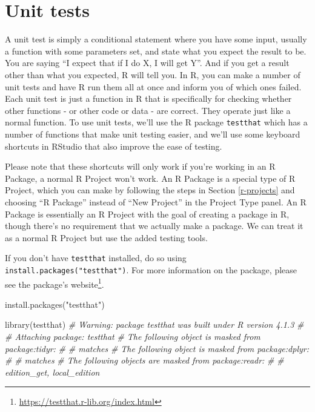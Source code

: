 \documentclass[
  a4paper,
]{krantz}
\makeatletter
\newenvironment{Shaded}{\begin{snugshade}}{\end{snugshade}}
\newcommand{\CommentTok}[1]{\textcolor[rgb]{0.37,0.37,0.37}{\textit{#1}}}
\newcommand{\FunctionTok}[1]{\textcolor[rgb]{0,0,0}{#1}}
\newcommand{\NormalTok}[1]{#1}
\newcommand{\StringTok}[1]{\textcolor[rgb]{0.5,0.5,0.5}{#1}}
\renewcommand{\href}[2]{#2\footnote{\url{#1}}}
\newenvironment{kframe}{%
\medskip{}
\setlength{\fboxsep}{.8em}
 \def\at@end@of@kframe{}%
 \ifinner\ifhmode%
  \def\at@end@of@kframe{\end{minipage}}%
  \begin{minipage}{\columnwidth}%
 \fi\fi%
 \def\FrameCommand##1{\hskip\@totalleftmargin \hskip-\fboxsep
 \colorbox{shadecolor}{##1}\hskip-\fboxsep
     \hskip-\linewidth \hskip-\@totalleftmargin \hskip\columnwidth}%
 \MakeFramed {\advance\hsize-\width
   \@totalleftmargin\z@ \linewidth\hsize
   \@setminipage}}%
 {\par\unskip\endMakeFramed%
 \at@end@of@kframe}
\renewenvironment{Shaded}{\begin{kframe}}{\end{kframe}}
\makeatother
\begin{document}
\hypertarget{unit-tests}{%
\section{Unit tests}\label{unit-tests}}

A unit test is simply a conditional statement where you have
some input, usually a function with some parameters set, and
state what you expect the result to be. You are saying ``I
expect that if I do X, I will get Y''. And if you get a
result other than what you expected, R will tell you. In R,
you can make a number of unit tests and have R run them all
at once and inform you of which ones failed. Each unit test
is just a function in R that is specifically for checking
whether other functions - or other code or data - are
correct. They operate just like a normal function. To use
unit tests, we'll use the R package \texttt{testthat} which
has a number of functions that make unit testing easier, and
we'll use some keyboard shortcuts in RStudio that also
improve the ease of testing.

Please note that these shortcuts will only work if you're
working in an R Package, a normal R Project won't work. An R
Package is a special type of R Project, which you can make
by following the steps in Section \ref{r-projects} and
choosing ``R Package'' instead of ``New Project'' in the
Project Type panel. An R Package is essentially an R Project
with the goal of creating a package in R, though there's no
requirement that we actually make a package. We can treat it
as a normal R Project but use the added testing tools.

If you don't have \texttt{testthat} installed, do so using
\texttt{install.packages("testthat")}. For more information
on the package, please see the package's
\href{https://testthat.r-lib.org/index.html}{website}.

\begin{Shaded}
\begin{Highlighting}[]
\FunctionTok{install.packages}\NormalTok{(}\StringTok{"testthat"}\NormalTok{)}
\end{Highlighting}
\end{Shaded}

\begin{Shaded}
\begin{Highlighting}[]
\FunctionTok{library}\NormalTok{(testthat)}
\CommentTok{\# Warning: package \textquotesingle{}testthat\textquotesingle{} was built under R version 4.1.3}
\CommentTok{\# }
\CommentTok{\# Attaching package: \textquotesingle{}testthat\textquotesingle{}}
\CommentTok{\# The following object is masked from \textquotesingle{}package:tidyr\textquotesingle{}:}
\CommentTok{\# }
\CommentTok{\#     matches}
\CommentTok{\# The following object is masked from \textquotesingle{}package:dplyr\textquotesingle{}:}
\CommentTok{\# }
\CommentTok{\#     matches}
\CommentTok{\# The following objects are masked from \textquotesingle{}package:readr\textquotesingle{}:}
\CommentTok{\# }
\CommentTok{\#     edition\_get, local\_edition}
\end{Highlighting}
\end{Shaded}
\end{document}
